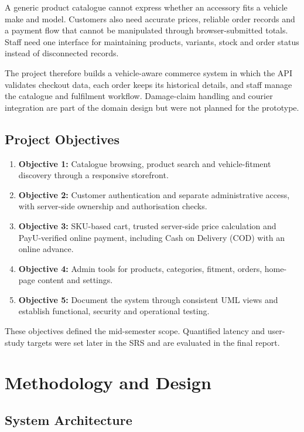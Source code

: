 \documentclass{tietreport}
\begin{document}
A generic product catalogue cannot express whether an accessory fits a
vehicle make and model. Customers also need accurate prices, reliable order
records and a payment flow that cannot be manipulated through
browser-submitted totals. Staff need one interface for maintaining products,
variants, stock and order status instead of disconnected records.

The project therefore builds a vehicle-aware commerce system in which the API
validates checkout data, each order keeps its historical details, and staff
manage the catalogue and fulfilment workflow. Damage-claim handling and
courier integration are part of the domain design but were not planned for
the prototype.

\section{Project Objectives}

\begin{enumerate}
  \item \textbf{Objective 1:} Catalogue browsing, product search and
        vehicle-fitment discovery through a responsive storefront.
  \item \textbf{Objective 2:} Customer authentication and separate
        administrative access, with server-side ownership and authorisation
        checks.
  \item \textbf{Objective 3:} SKU-based cart, trusted server-side price
        calculation and PayU-verified online payment, including Cash on
        Delivery (COD) with an online advance.
  \item \textbf{Objective 4:} Admin tools for products, categories, fitment,
        orders, home-page content and settings.
  \item \textbf{Objective 5:} Document the system through consistent UML
        views and establish functional, security and operational testing.
\end{enumerate}

These objectives defined the mid-semester scope. Quantified latency and
user-study targets were set later in the SRS and are evaluated in the final
report.

\chapter{Methodology and Design}

\section{System Architecture}
\end{document}
